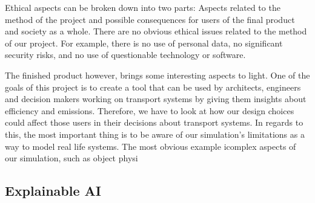 
Ethical aspects can be broken down into two parts: Aspects related to the method of the project and possible consequences for users of the final product and society as a whole. There are no obvious ethical issues related to the method of our project. For example, there is no use of personal data, no significant security risks, and no use of questionable technology or software.

The finished product however, brings some interesting aspects to light. One of the goals of this project is to create a tool that can be used by architects, engineers and decision makers working on transport systems by giving them insights about efficiency and emissions. Therefore, we have to look at how our design choices could affect those users in their decisions about transport systems. In regards to this, the most important thing is to be aware of our simulation's limitations as a way to model real life systems. The most obvious example icomplex aspects of our simulation, such as object physi

\subsection{Explainable AI}
